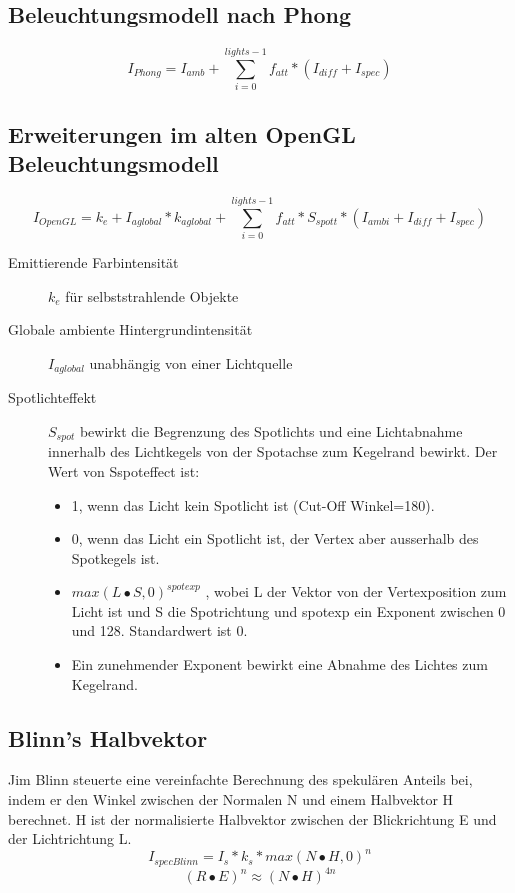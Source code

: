 \documentclass[10pt]{article}
\begin{document}
\subsection{Beleuchtungsmodell nach Phong}
\begin{equation}
	I_{Phong}=I_{amb} + \sum_{i=0}^{lights-1} f_{att} * (I_{diff} + I_{spec})
\end{equation}
\subsection{Erweiterungen im alten OpenGL Beleuchtungsmodell}
\begin{equation}
	I_{OpenGL}=k_e + I_{aglobal} * k_{aglobal} + \sum_{i=0}^{lights-1} f_{att} *  S_{spott} * (I_{ambi} + I_{diff} + I_{spec})
\end{equation}
\begin{description}
	\item[Emittierende Farbintensität] $k_e$ für selbststrahlende Objekte
	\item[Globale ambiente Hintergrundintensität] $I_{aglobal}$ unabhängig von einer Lichtquelle
	\item[Spotlichteffekt] $S_{spot}$ bewirkt die Begrenzung des Spotlichts und eine Lichtabnahme innerhalb des Lichtkegels von der Spotachse zum Kegelrand bewirkt. Der Wert von Sspoteffect ist:
	\begin{itemize}
		\item 1, wenn das Licht kein Spotlicht ist (Cut-Off Winkel=180).
		\item 0, wenn das Licht ein Spotlicht ist, der Vertex aber ausserhalb des Spotkegels ist.		
		\item $max(L \bullet S , 0)^{spotexp}$ , wobei L der Vektor von der Vertexposition zum Licht ist und S die Spotrichtung und spotexp ein Exponent zwischen 0 und 128. Standardwert ist 0.
		\item Ein zunehmender Exponent bewirkt eine Abnahme des Lichtes zum Kegelrand.
	\end{itemize}
\end{description}
\subsection{Blinn's Halbvektor}
Jim Blinn steuerte eine vereinfachte Berechnung des spekulären Anteils bei, indem er den Winkel zwischen der Normalen N und einem Halbvektor H berechnet. H ist der normalisierte Halbvektor zwischen der Blickrichtung E und der Lichtrichtung L.
\begin{equation}
I_{specBlinn}=I_s * k_s * max(N \bullet H ,0)^n
\end{equation}
\begin{equation}
(R \bullet E)^n \approx (N \bullet H)^{4n}
\end{equation}
\end{document}
